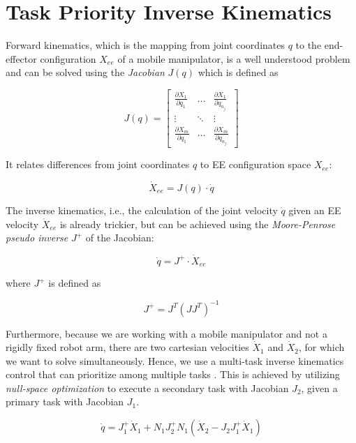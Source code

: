 \section{Task Priority Inverse Kinematics}
Forward kinematics, which is the mapping from joint coordinates $q$ to the end-effector configuration $X_{ee}$ of a mobile manipulator, is a well understood problem and can be solved using the \emph{Jacobian} $J(q)$ which is defined as

\begin{equation}
J(q) =
\begin{bmatrix}
\frac{\partial X_1}{\partial q_1} & \hdots & \frac{\partial X_1}{\partial q_{n_j}} \\
\vdots & \ddots & \vdots \\
\frac{\partial X_m}{\partial q_1} & \hdots & \frac{\partial X_m}{\partial q_{n_j}}
\end{bmatrix}
\end{equation}

It relates differences from joint coordinates $q$ to EE configuration  space $X_{ee}$:

\begin{equation}
\dot{X}_{ee} = J(q) \cdot \dot{q}
\end{equation}

The inverse kinematics, i.e., the calculation of the joint velocity $\dot{q}$ given an EE velocity $\dot{X}_{ee}$ is already trickier, but can be achieved using the \emph{Moore-Penrose pseudo inverse} $J^+$ of the Jacobian:

\begin{equation}
\dot{q} = J^+ \cdot \dot{X}_{ee} 
\end{equation}

where $J^+$ is defined as

\begin{equation}
J^+ = J^T(JJ^T)^{-1}
\end{equation}

Furthermore, because we are working with a mobile manipulator and not a rigidly fixed robot arm, there are two cartesian velocities $\dot{X}_1$ and $\dot{X}_2$, for which we want to solve simultaneously. Hence, we use a multi-task inverse kinematics control that can prioritize among multiple tasks \citep{nakamura1987task}. This is achieved by utilizing \emph{null-space optimization} to execute a secondary task with Jacobian $J_2$, given a primary task with Jacobian $J_1$.

\begin{equation}
\dot{q} = J_1^+ \dot{X}_1 + N_1 J_2^+ N_1 (\dot{X}_2-J_2J_1^+\dot{X}_1)
\label{eq:task_priority}
\end{equation}

